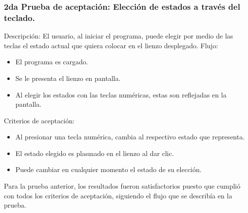     \subsubsection{2da Prueba de aceptaci\'on: Elecci\'on de estados a trav\'es del teclado.}
    Descripci\'on: El usuario, al iniciar el programa, puede elegir
        por medio de las teclas el estado actual que quiera colocar en
        el lienzo desplegado.
    \vskip 0.5cm
    Flujo:
    \vskip 0.5cm
    \begin{itemize}
        \item El programa es cargado.
        \item Se le presenta el lienzo en pantalla.
        \item Al elegir los estados con las teclas num\'ericas, estas son
        reflejadas en la pantalla.
    \end{itemize}
    Criterios de aceptaci\'on:
    \begin{itemize}
        \item Al presionar una tecla num\'erica, cambia al
            respectivo estado que representa.
        \item El estado elegido es plasmado en el lienzo al dar clic.
        \item Puede cambiar en cualquier momento el estado de su elecci\'on.
    \end{itemize}
    \vskip 0.5cm
    Para la prueba anterior, los resultados fueron satisfactorios
        puesto que cumpli\'o con todos los criterios de aceptaci\'on,
        siguiendo el flujo que se describ\'ia en la prueba.
